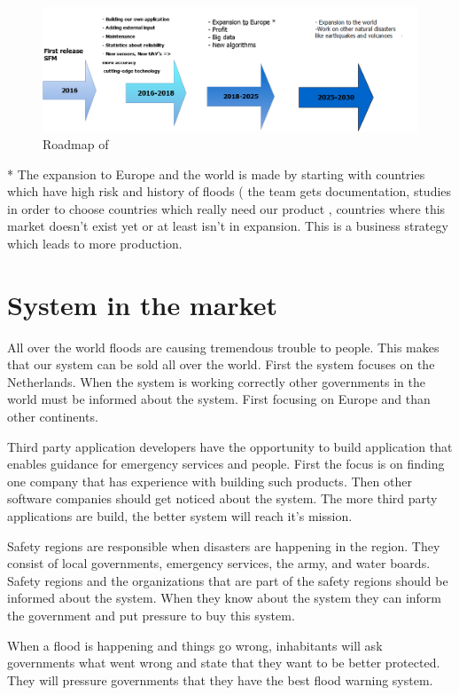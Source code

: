 \begin{figure}[H]
	\centering
	\includegraphics[scale=0.5]{images/Roadmap.png}
	\caption{Roadmap of \CompanyName{}}
	\label{fig:roadmap}
\end{figure}

* The expansion to Europe and the world is made by starting with countries which have high risk and history of floods ( the team gets documentation, studies in order to choose countries which really need our product , countries where this market doesn't exist yet or at least isn't in expansion. This is a business strategy which leads to more production. \\

\section{System in the market}
All over the world floods are causing tremendous trouble to people. This makes that our system can be sold all over the world. First the system focuses on the Netherlands. When the system is working correctly other governments in the world must be informed about the system. First focusing on Europe and than other continents.

Third party application developers have the opportunity to build application that enables guidance for emergency services and people. First the focus is on finding one company that has experience with building such products. Then other software companies should get noticed about the system. The more third party applications are build, the better system will reach it's mission.

Safety regions are responsible when disasters are happening in the region. They consist of local governments, emergency services, the army, and water boards. Safety regions and the organizations that are part of the safety regions should be informed about the system. When they know about the system they can inform the government and put pressure to buy this system.

When a flood is happening and things go wrong, inhabitants will ask governments what went wrong and state that they want to be better protected. They will pressure governments that they have the best flood warning system.

